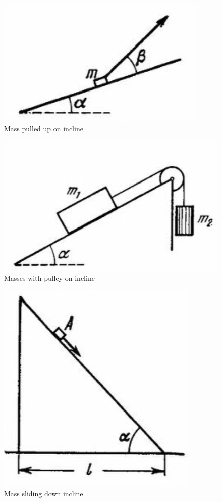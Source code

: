 \documentclass{article}
\begin{document}
\begin{figure}
    \centering
    \includegraphics[width=0.5\linewidth]{assets/mass on incline.png}
    \caption{Mass pulled up on incline}
    \label{mass pulled up incline}
\end{figure}

\begin{figure}
    \centering
    \includegraphics[width=0.5\linewidth]{assets/masses with pulley on incline.png}
    \caption{Masses with pulley on incline}
    \label{masses with pulley on incline}
\end{figure}



\begin{figure}
    \centering
    \includegraphics[width=0.5\linewidth]{assets/masses sliding down incline.png}
    \caption{Mass sliding down incline}
    \label{mass sliding down incline}
\end{figure}
\end{document}
